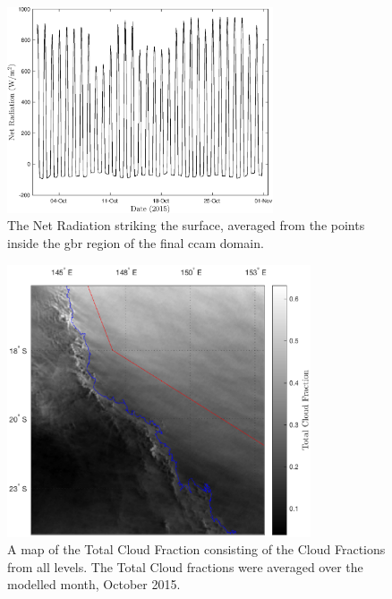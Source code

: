 \begin{figure}[!hbt]
    \centering
    \includegraphics[width=0.70\textwidth]{Fig/Research/CCAM/GBRAveragedPlot_rnet_ave.eps}
    \caption{ The Net Radiation striking the surface, averaged from the points inside the \gls{gbr} region of the final \gls{ccam} domain. }
    \label{fig:rnettime}
\end{figure}

\begin{figure}[!hbt]
    \centering
    \includegraphics[width=0.8\textwidth]{Fig/Research/CCAM/TimeAveragedMap_cld.eps}
    \vspace{-1cm}
    \caption{ A map of the Total Cloud Fraction consisting of the Cloud Fractions from all levels. The Total Cloud fractions were averaged over the modelled month, October 2015. }
    \label{fig:cldmap}
\end{figure}

